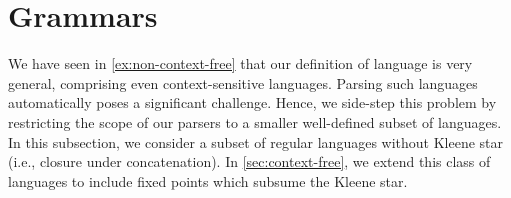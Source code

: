 

\section{Grammars}\label{sec:gram-and-parsing}

We have seen in \cref{ex:non-context-free} that our definition of language is very general, comprising even context-sensitive languages. Parsing such languages automatically poses a significant challenge. Hence, we side-step this problem by restricting the scope of our parsers to a smaller well-defined subset of languages. In this subsection, we consider a subset of regular languages without Kleene star (i.e., closure under concatenation). In \cref{sec:context-free}, we extend this class of languages to include fixed points which subsume the Kleene star.

